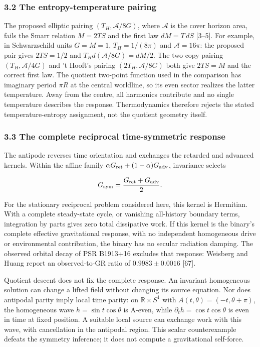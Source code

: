 \documentclass[
]{article}
\begin{document}
\subsubsection{3.2 The entropy-temperature
pairing}\label{the-entropy-temperature-pairing}

The proposed elliptic pairing \((T_H,\mathcal A/8G)\), where
\(\mathcal A\) is the cover horizon area, fails the Smarr relation
\(M=2TS\) and the first law \(dM=T\,dS\) {[}3--5{]}. For example, in
Schwarzschild units \(G=M=1\), \(T_H=1/(8\pi)\) and
\(\mathcal A=16\pi\): the proposed pair gives \(2TS=1/2\) and
\(T_Hd(\mathcal A/8G)=dM/2\). The two-copy pairing
\((T_H,\mathcal A/4G)\) and 't Hooft's pairing \((2T_H,\mathcal A/8G)\)
both give \(2TS=M\) and the correct first law. The quotient two-point
function used in the comparison has imaginary period \(\pi R\) at the
central worldline, so its even sector realizes the latter temperature.
Away from the centre, all harmonics contribute and no single temperature
describes the response. Thermodynamics therefore rejects the stated
temperature-entropy assignment, not the quotient geometry itself.

\subsubsection{3.3 The complete reciprocal time-symmetric
response}\label{the-complete-reciprocal-time-symmetric-response}

The antipode reverses time orientation and exchanges the retarded and
advanced kernels. Within the affine family
\(\alpha G_{\rm ret}+(1-\alpha)G_{\rm adv}\), invariance selects

\[
G_{\rm sym}=\frac{G_{\rm ret}+G_{\rm adv}}{2}.
\]

For the stationary reciprocal problem considered here, this kernel is
Hermitian. With a complete steady-state cycle, or vanishing all-history
boundary terms, integration by parts gives zero total dissipative work.
If this kernel is the binary's complete effective gravitational
response, with no independent homogeneous drive or environmental
contribution, the binary has no secular radiation damping. The observed
orbital decay of PSR B1913+16 excludes that response: Weisberg and Huang
report an observed-to-GR ratio of \(0.9983\pm0.0016\) {[}67{]}.

Quotient descent does not fix the complete response. An invariant
homogeneous solution can change a lifted field without changing its
source equation. Nor does antipodal parity imply local time parity: on
\(\mathbb R\times S^1\) with \(A(t,\theta)=(-t,\theta+\pi)\), the
homogeneous wave \(h=\sin t\cos\theta\) is A-even, while
\(\partial_t h=\cos t\cos\theta\) is even in time at fixed position. A
suitable local source can exchange work with this wave, with
cancellation in the antipodal region. This scalar counterexample defeats
the symmetry inference; it does not compute a gravitational self-force.
\end{document}
